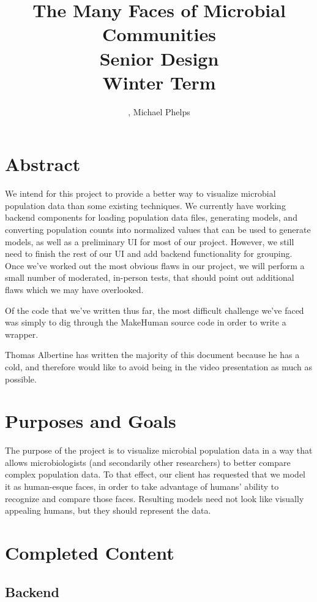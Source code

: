\documentclass[letterpaper,10pt, onecolumn]{IEEEtran}
\title{The Many Faces of Microbial Communities \\\large Senior Design\\Winter Term\\}
\author{\name, Michael Phelps}
\begin{document}
\maketitle
\section*{Abstract}
We intend for this project to provide a better way to visualize microbial population data than some existing techniques. We currently have working backend components for loading population data files, generating models, and converting population counts into normalized values that can be used to generate models, as well as a preliminary UI for most of our project. However, we still need to finish the rest of our UI and add backend functionality for grouping. Once we've worked out the most obvious flaws in our project, we will perform a small number of moderated, in-person tests, that should point out additional flaws which we may have overlooked. 

Of the code that we've written thus far, the most difficult challenge we've faced was simply to dig through the MakeHuman source code in order to write a wrapper. 

Thomas Albertine has written the majority of this document because he has a cold, and therefore would like to avoid being in the video presentation as much as possible.

\clearpage
\section*{Purposes and Goals}

The purpose of the project is to visualize microbial population data in a way that allows microbiologists (and secondarily other researchers) to better compare complex population data. To that effect, our client has requested that we model it as human-esque faces, in order to take advantage of humans' ability to recognize and compare those faces. Resulting models need not look like visually appealing humans, but they should represent the data.

\section*{Completed Content}

\subsection*{Backend}
\end{document}
